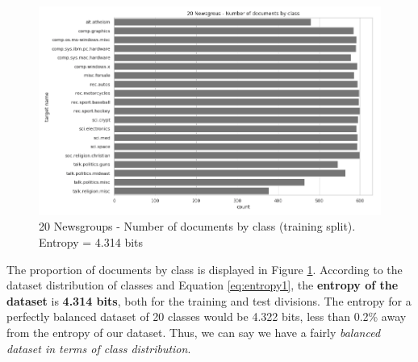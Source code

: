 \documentclass[10pt,journal,compsoc, onecolumn]{IEEEtran}
\begin{document}
\begin{table}[h]
\caption{20 Newsgroups dataset: grouped by content similarity}
\label{tab:groups}
\begin{center}
\end{center}
\end{table}

\begin{figure}[h]
      \centering
      \includegraphics[width=\linewidth]{images/chart_01.png}
      \caption{20 Newsgroups - Number of documents by class (training split). Entropy = 4.314 bits}
      \label{fig:numbyclass}
\end{figure}

The proportion of documents by class is displayed in Figure \ref{fig:numbyclass}. According to the dataset distribution of classes and Equation \ref{eq:entropy1}, the \textbf{entropy of the dataset} is \textbf{4.314 bits}, both for the training and test divisions. The entropy for a perfectly balanced dataset of 20 classes would be 4.322 bits, less than 0.2\% away from the entropy of our dataset. Thus, we can say we have a fairly \textit{balanced dataset in terms of class distribution}.
\end{document}
